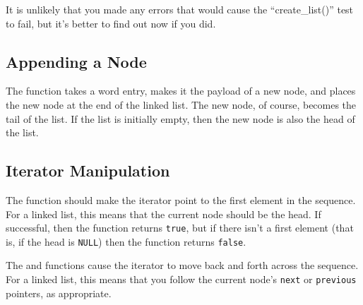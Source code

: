It is unlikely that you made any errors that would cause the ``create\_list()'' test to fail,
but it's better to find out now if you did.


\subsection{Appending a Node}

The  function takes a word entry, makes it the payload of a new node, and places the new node at the end of the linked list.
The new node, of course, becomes the tail of the list.
If the list is initially empty, then the new node is also the head of the list.

\begin{description}
\end{description}


\subsection{Iterator Manipulation}

The  function should make the iterator point to the first element in the sequence.
For a linked list, this means that the current node should be the head.
If successful, then the function returns \lstinline{true},
but if there isn't a first element (that is, if the head is \lstinline{NULL}) then the function returns \lstinline{false}.

The  and  functions cause the iterator to move back and forth across the sequence.
For a linked list, this means that you follow the current node's \lstinline{next} or \lstinline{previous} pointers, as appropriate.

